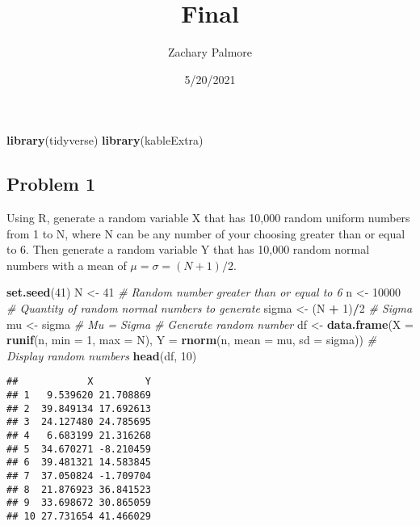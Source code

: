 \documentclass[
]{article}
\title{Final}
\author{Zachary Palmore}
\date{5/20/2021}
\newenvironment{Shaded}{\begin{snugshade}}{\end{snugshade}}
\newcommand{\CommentTok}[1]{\textcolor[rgb]{0.56,0.35,0.01}{\textit{#1}}}
\newcommand{\DataTypeTok}[1]{\textcolor[rgb]{0.13,0.29,0.53}{#1}}
\newcommand{\DecValTok}[1]{\textcolor[rgb]{0.00,0.00,0.81}{#1}}
\newcommand{\KeywordTok}[1]{\textcolor[rgb]{0.13,0.29,0.53}{\textbf{#1}}}
\newcommand{\NormalTok}[1]{#1}
\newcommand{\OperatorTok}[1]{\textcolor[rgb]{0.81,0.36,0.00}{\textbf{#1}}}
\newcommand{\StringTok}[1]{\textcolor[rgb]{0.31,0.60,0.02}{#1}}
\begin{document}
\maketitle

\begin{Shaded}
\begin{Highlighting}[]
\KeywordTok{library}\NormalTok{(tidyverse)}
\KeywordTok{library}\NormalTok{(kableExtra)}
\end{Highlighting}
\end{Shaded}

\hypertarget{problem-1}{%
\subsection{Problem 1}\label{problem-1}}

Using R, generate a random variable X that has 10,000 random uniform
numbers from 1 to N, where N can be any number of your choosing greater
than or equal to 6. Then generate a random variable Y that has 10,000
random normal numbers with a mean of \(\mu=\sigma=(N+1)/2.\)

\begin{Shaded}
\begin{Highlighting}[]
\KeywordTok{set.seed}\NormalTok{(}\DecValTok{41}\NormalTok{)}
\NormalTok{N <-}\StringTok{ }\DecValTok{41} \CommentTok{# Random number greater than or equal to 6}
\NormalTok{n <-}\StringTok{ }\DecValTok{10000} \CommentTok{# Quantity of random normal numbers to generate}
\NormalTok{sigma <-}\StringTok{ }\NormalTok{(N }\OperatorTok{+}\StringTok{ }\DecValTok{1}\NormalTok{)}\OperatorTok{/}\DecValTok{2} \CommentTok{# Sigma}
\NormalTok{mu <-}\StringTok{ }\NormalTok{sigma }\CommentTok{# Mu = Sigma}
\CommentTok{# Generate random number}
\NormalTok{df <-}\StringTok{ }\KeywordTok{data.frame}\NormalTok{(}\DataTypeTok{X =} \KeywordTok{runif}\NormalTok{(n, }\DataTypeTok{min =} \DecValTok{1}\NormalTok{, }\DataTypeTok{max =}\NormalTok{ N), }
                 \DataTypeTok{Y =} \KeywordTok{rnorm}\NormalTok{(n, }\DataTypeTok{mean =}\NormalTok{ mu, }\DataTypeTok{sd =}\NormalTok{ sigma))}
\CommentTok{# Display random numbers}
\KeywordTok{head}\NormalTok{(df, }\DecValTok{10}\NormalTok{)}
\end{Highlighting}
\end{Shaded}

\begin{verbatim}
##            X         Y
## 1   9.539620 21.708869
## 2  39.849134 17.692613
## 3  24.127480 24.785695
## 4   6.683199 21.316268
## 5  34.670271 -8.210459
## 6  39.481321 14.583845
## 7  37.050824 -1.709704
## 8  21.876923 36.841523
## 9  33.698672 30.865059
## 10 27.731654 41.466029
\end{verbatim}
\end{document}
